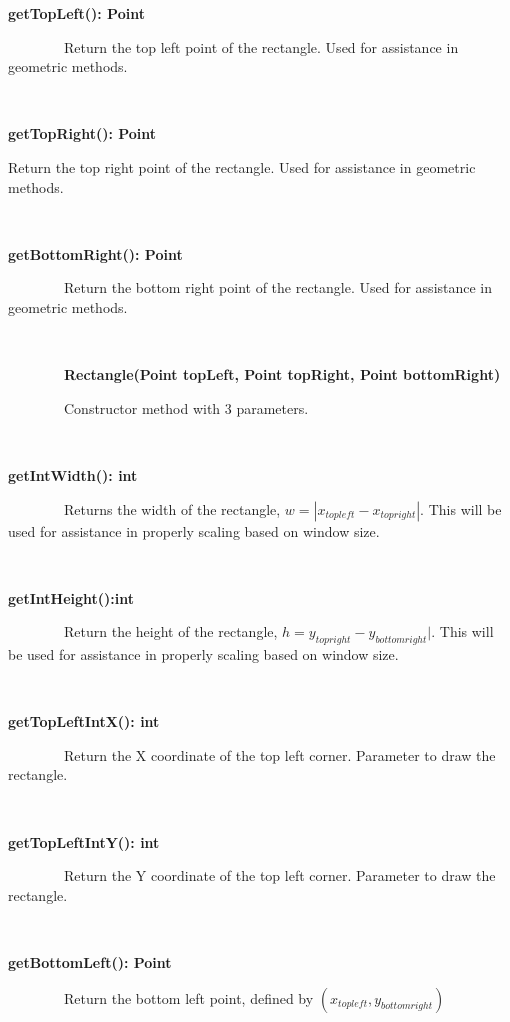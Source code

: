 \documentclass{article}
\begin{document}
{{\textbf{getTopLeft(): Point}}

{~~~~~~~~Return the top left point of the rectangle. Used for assistance
in geometric methods. }

{~~~~~~~~}

{\textbf{getTopRight(): Point}}

{Return the top right point of the rectangle. Used for assistance in
geometric methods.}

{~~~~~~~~~~~~~~~~}

{\textbf{getBottomRight(): Point}}

{~~~~~~~~Return the bottom right point of the rectangle. Used for assistance in geometric methods.}

{~~~~~~~~}

{~~~~~~~~\textbf{Rectangle(Point topLeft, Point topRight, Point bottomRight)}}

{~~~~~~~~Constructor method with 3 parameters.}

{~~~~~~~~~~~~~~~~}

{\textbf{getIntWidth(): int}}

{~~~~~~~~Returns the width of the rectangle, \(w = |x_{top left} - x_{top right}|\). This will be used for assistance in properly scaling based on window size.}

{~~~~~~~~~~~~~~~~}

{\textbf{getIntHeight():int }}

{~~~~~~~~Return the height of the rectangle, \(h = y_{top right} - y_{bottom right}|\). This will be used for assistance in properly scaling based on window size.}

{~~~~~~~~~~~~~~~~}

{\textbf{getTopLeftIntX(): int}}

{~~~~~~~~Return the X coordinate of the top left corner. Parameter to
draw the rectangle.}

{~~~~~~~~~~~~~~~~}

{\textbf{getTopLeftIntY(): int}}

{~~~~~~~~Return the Y coordinate of the top left corner. Parameter to
draw the rectangle.}

{~~~~~~~~~~~~~~~~}

{\textbf{getBottomLeft(): Point}}

{~~~~~~~~Return the bottom left point, defined by \((x_{top left}, y_{bottom right})\)}

{}

{~~~~~~~~}

{}

}
\end{document}
